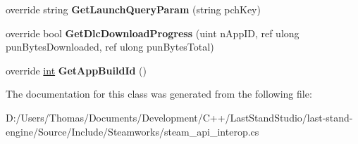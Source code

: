 \begin{DoxyCompactItemize}
\item 
\hypertarget{classValve_1_1Steamworks_1_1CSteamApps_a2bb865b7e0c439bffee3dd89302c8bbb}{}override string {\bfseries Get\+Launch\+Query\+Param} (string pch\+Key)\label{classValve_1_1Steamworks_1_1CSteamApps_a2bb865b7e0c439bffee3dd89302c8bbb}

\item 
\hypertarget{classValve_1_1Steamworks_1_1CSteamApps_a2c20d6e99aabd2befa93b969c7d3860b}{}override bool {\bfseries Get\+Dlc\+Download\+Progress} (uint n\+App\+I\+D, ref ulong pun\+Bytes\+Downloaded, ref ulong pun\+Bytes\+Total)\label{classValve_1_1Steamworks_1_1CSteamApps_a2c20d6e99aabd2befa93b969c7d3860b}

\item 
\hypertarget{classValve_1_1Steamworks_1_1CSteamApps_a43b99891c6190cb89d820957e300ccb5}{}override \hyperlink{SDL__thread_8h_a6a64f9be4433e4de6e2f2f548cf3c08e}{int} {\bfseries Get\+App\+Build\+Id} ()\label{classValve_1_1Steamworks_1_1CSteamApps_a43b99891c6190cb89d820957e300ccb5}

\end{DoxyCompactItemize}


The documentation for this class was generated from the following file\+:\begin{DoxyCompactItemize}
\item 
D\+:/\+Users/\+Thomas/\+Documents/\+Development/\+C++/\+Last\+Stand\+Studio/last-\/stand-\/engine/\+Source/\+Include/\+Steamworks/steam\+\_\+api\+\_\+interop.\+cs\end{DoxyCompactItemize}
